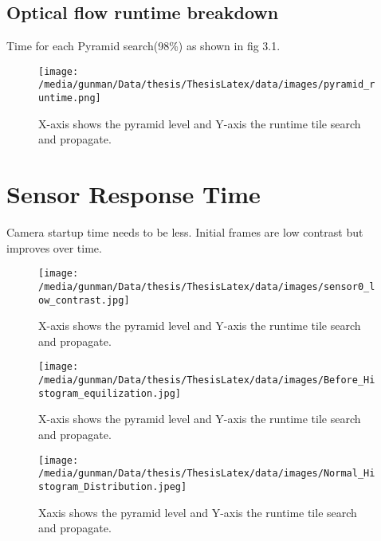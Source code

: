 \subsection{Optical flow runtime breakdown}
Time for each Pyramid search(98\%) as shown in fig 3.1.
\begin{figure*}
	\begin{center}
		\texttt{[image: /media/gunman/Data/thesis/ThesisLatex/data/images/pyramid\_runtime.png]}
		\caption{X-axis shows the pyramid level and Y-axis the runtime tile search and propagate.}
		\label{fig:ex_4_9}
	\end{center}
	\vspace{-0.3in}
\end{figure*} 

\section{Sensor Response Time}
Camera startup time needs to be less. 
	Initial frames are low contrast but improves over time. 
	\begin{figure*}
		\begin{center}
			\texttt{[image: /media/gunman/Data/thesis/ThesisLatex/data/images/sensor0\_low\_contrast.jpg]}
			\caption{X-axis shows the pyramid level and Y-axis the runtime tile search and propagate.}
			\label{fig:ex_4_9}
		\end{center}
		\vspace{-0.3in}
	\end{figure*} 

	\begin{figure*}
	\begin{center}
		\texttt{[image: /media/gunman/Data/thesis/ThesisLatex/data/images/Before\_Histogram\_equilization.jpg]}
		\caption{X-axis shows the pyramid level and Y-axis the runtime tile search and propagate.}
		\label{fig:ex_4_9}
	\end{center}
	\vspace{-0.3in}
\end{figure*} 

	\begin{figure*}
	\begin{center}
		\texttt{[image: /media/gunman/Data/thesis/ThesisLatex/data/images/Normal\_Histogram\_Distribution.jpeg]}
		\caption{Xaxis shows the pyramid level and Y-axis the runtime tile search and propagate.}
		\label{fig:ex_4_9}
	\end{center}
	\vspace{-0.3in}
\end{figure*} 


